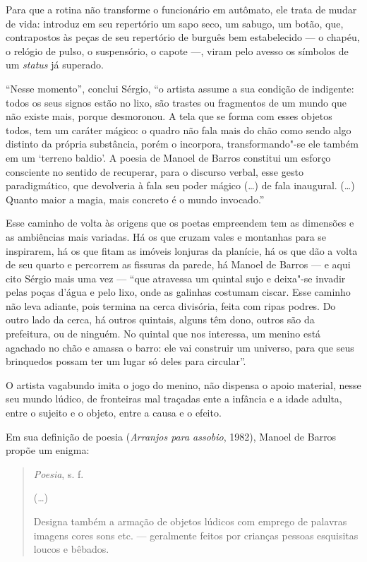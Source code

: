 Para que a rotina não transforme o funcionário em autômato, ele trata de
mudar de vida: introduz em seu repertório um sapo seco, um sabugo, um
botão, que, contrapostos às peças de seu repertório de burguês bem
estabelecido --- o chapéu, o relógio de pulso, o suspensório, o capote
---, viram pelo avesso os símbolos de um \emph{status} já superado.

``Nesse momento'', conclui Sérgio, ``o artista assume a sua condição
de indigente: todos os seus signos estão no lixo, são trastes ou
fragmentos de um mundo que não existe mais, porque desmoronou. A tela
que se forma com esses objetos todos, tem um caráter mágico: o quadro
não fala mais do chão como sendo algo distinto da própria substância,
porém o incorpora, transformando"-se ele também em um `terreno baldio'.
A poesia de Manoel de Barros constitui um esforço consciente no sentido
de recuperar, para o discurso verbal, esse gesto paradigmático, que
devolveria à fala seu poder mágico (\ldots{}) de fala inaugural. (\ldots{}) Quanto
maior a magia, mais concreto é o mundo invocado.''

Esse caminho de volta às origens que os poetas empreendem tem as
dimensões e as ambiências mais variadas. Há os que cruzam vales e
montanhas para se inspirarem, há os que fitam as imóveis
lonjuras da planície, há os que dão a volta de seu quarto e percorrem as
fissuras da parede, há Manoel de Barros --- e aqui cito Sérgio mais uma
vez --- ``que atravessa um quintal sujo e deixa"-se invadir pelas poças
d'água e pelo lixo, onde as galinhas costumam ciscar. Esse caminho não
leva adiante, pois termina na cerca divisória, feita com ripas podres.
Do outro lado da cerca, há outros quintais, alguns têm dono, outros são
da prefeitura, ou de ninguém. No quintal que nos interessa, um menino
está agachado no chão e amassa o barro: ele vai construir um universo,
para que seus brinquedos possam ter um lugar só deles para circular''.

O artista vagabundo imita o jogo do menino, não dispensa o apoio
material, nesse seu mundo lúdico, de fronteiras mal traçadas ente a
infância e a idade adulta, entre o sujeito e o objeto, entre a causa e o
efeito.

Em sua definição de poesia (\emph{Arranjos para assobio}, 1982), Manoel
de Barros propõe um enigma:

\pagebreak

\begin{quotation}
\emph{Poesia}, s. f.

(\ldots{})

Designa também a armação de objetos lúdicos com emprego de palavras
imagens cores sons etc. --- geralmente feitos por crianças
pessoas esquisitas loucos e bêbados.
\end{quotation}


